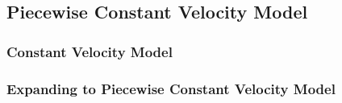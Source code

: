 \subsection{Piecewise Constant Velocity Model}
\label{sec:Method:PiecewiseConstantVModel}

\subsubsection{Constant Velocity Model}
\label{sec:Method:PiecewiseConstantVModel:ConstantVelocityModel}



\subsubsection{Expanding to Piecewise Constant Velocity Model}
\label{sec:Method:PiecewiseConstantVModel:PiecewiseConstantVelocityModel}



